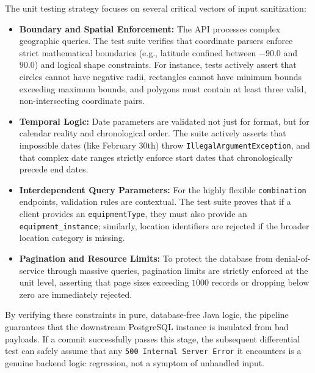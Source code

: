The unit testing strategy focuses on several critical vectors of input
sanitization:

\begin{itemize}
	\item \textbf{Boundary and Spatial Enforcement:} The \ac{API} processes complex
		geographic queries. The test suite verifies that coordinate parsers
		enforce strict mathematical boundaries (e.g., latitude confined between $-
		90.0$ and $90.0$) and logical shape constraints. For instance, tests
		actively assert that circles cannot have negative radii, rectangles cannot
		have minimum bounds exceeding maximum bounds, and polygons must contain
		at least three valid, non-intersecting coordinate pairs.

	\item \textbf{Temporal Logic:} Date parameters are validated not just for
		format, but for calendar reality and chronological order. The suite
		actively asserts that impossible dates (like February 30th) throw
		\texttt{IllegalArgumentException}, and that complex date ranges
		strictly enforce start dates that chronologically precede end dates.

	\item \textbf{Interdependent Query Parameters:} For the highly flexible
		\texttt{combination} endpoints, validation rules are contextual. The test
		suite proves that if a client provides an \texttt{equipmentType}, they must
		also provide an \texttt{equipment\_instance}; similarly, location
		identifiers are rejected if the broader location category is missing.

	\item \textbf{Pagination and Resource Limits:} To protect the database
		from denial-of-service through massive queries, pagination limits are strictly
		enforced at the unit level, asserting that page sizes exceeding $1000$
		records or dropping below zero are immediately rejected.
\end{itemize}

By verifying these constraints in pure, database-free Java logic, the pipeline
guarantees that the downstream PostgreSQL instance is insulated from bad payloads.
If a commit successfully passes this stage, the subsequent differential test
can safely assume that any \texttt{500 Internal Server Error} it encounters
is a genuine backend logic regression, not a symptom of unhandled input.

